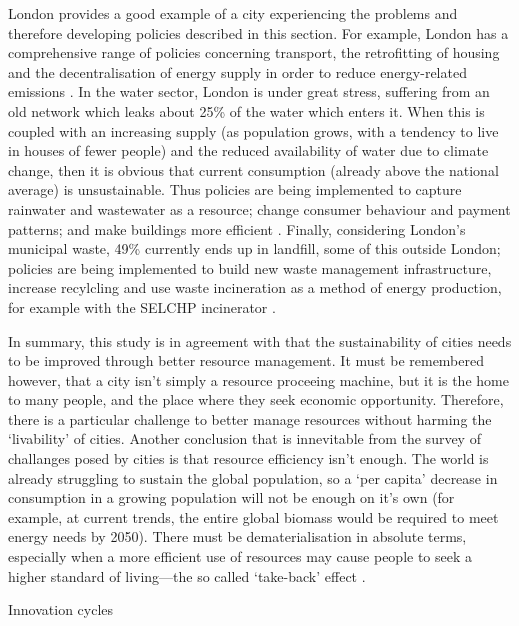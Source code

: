 London provides a good example of a city experiencing the problems and therefore developing policies described in this section. For example, London has a comprehensive range of policies concerning transport, the retrofitting of housing and the decentralisation of energy supply in order to reduce energy-related emissions \citep{Davis2011}. In the water sector, London is under great stress, suffering from an old network which leaks about 25\% of the water which enters it. When this is coupled with an increasing supply (as population grows, with a tendency to live in houses of fewer people) and the reduced availability of water due to climate change, then it is obvious that current consumption (already above the national average) is unsustainable. Thus policies are being implemented to capture rainwater and wastewater as a resource; change consumer behaviour and payment patterns; and make buildings more efficient \citep{Nickson2011}. Finally, considering London's municipal waste, 49\% currently ends up in landfill, some of this outside London; policies are being implemented to build new waste management infrastructure, increase recylcling and use waste incineration as a method of energy production, for example with the SELCHP incinerator \citep{Zabal2011}.

In summary, this study is in agreement with \citet{Newman1999} that the sustainability of cities needs to be improved through better resource management. It must be remembered however, that a city isn't simply a resource proceeing machine, but it is the home to many people, and the place where they seek economic opportunity.  Therefore, there is a particular challenge to better manage resources without harming the `livability' of cities. Another conclusion that is innevitable from the survey of challanges posed by cities is that resource efficiency isn't enough. The world is already struggling to sustain the global population, so a `per capita' decrease in consumption in a growing population will not be enough on it's own (for example, at current trends, the entire global biomass would be required to meet energy needs by 2050). There must be dematerialisation in absolute terms, especially when a more efficient use of resources may cause people to seek a higher standard of living---the so called `take-back' effect \citep{Winiwater2011}.

\citep{Bettencourt2007} Innovation cycles


